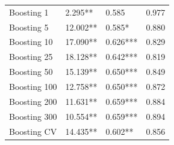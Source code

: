 \begin{table}
\begin{tabular}[t]{lllr}
Boosting 1 & 2.295** & 0.585 & 0.977\\
Boosting 5 & 12.002** & 0.585* & 0.880\\
Boosting 10 & 17.090** & 0.626*** & 0.829\\
\addlinespace
Boosting 25 & 18.128** & 0.642*** & 0.819\\
Boosting 50 & 15.139** & 0.650*** & 0.849\\
Boosting 100 & 12.758** & 0.650*** & 0.872\\
Boosting 200 & 11.631** & 0.659*** & 0.884\\
Boosting 300 & 10.554** & 0.659*** & 0.894\\
\addlinespace
Boosting CV & 14.435** & 0.602** & 0.856\\
\bottomrule
\end{tabular}
\end{table}
